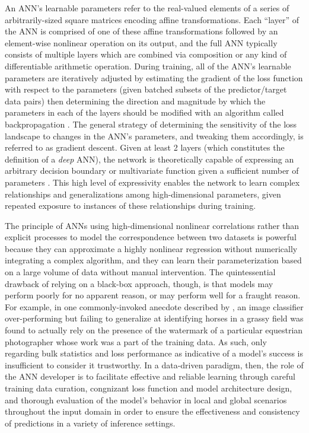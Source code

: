 An ANN's learnable parameters refer to the real-valued elements of a series of arbitrarily-sized square matrices encoding affine transformations. Each ``layer'' of the ANN is comprised of one of these affine transformations followed by an element-wise nonlinear operation on its output, and the full ANN typically consists of multiple layers which are combined via composition or any kind of differentiable arithmetic operation. During training, all of the ANN's learnable parameters are iteratively adjusted by estimating the gradient of the loss function with respect to the parameters (given batched subsets of the predictor/target data pairs) then determining the direction and magnitude by which the parameters in each of the layers should be modified with an algorithm called backpropagation \parencite{rumelhart_learning_1986}. The general strategy of determining the sensitivity of the loss landscape to changes in the ANN's parameters, and tweaking them accordingly, is referred to as gradient descent. Given at least 2 layers (which constitutes the definition of a \textit{deep} ANN), the network is theoretically capable of expressing an arbitrary decision boundary or multivariate function given a sufficient number of parameters \parencite{hornik_multilayer_1989}. This high level of expressivity enables the network to learn complex relationships and generalizations among high-dimensional parameters, given repeated exposure to instances of these relationships during training.

The principle of ANNs using high-dimensional nonlinear correlations rather than explicit processes to model the correspondence between two datasets is powerful because they can approximate a highly nonlinear regression without numerically integrating a complex algorithm, and they can learn their parameterization based on a large volume of data without manual intervention. The quintessential drawback of relying on a black-box approach, though, is that models may perform poorly for no apparent reason, or may perform well for a fraught reason. For example, in one commonly-invoked anecdote described by \parencite{lapuschkin_unmasking_2019}, an image classifier over-performing but failing to generalize at identifying horses in a grassy field was found to actually rely on the presence of the watermark of a particular equestrian photographer whose work was a part of the training data. As such, only regarding bulk statistics and loss performance as indicative of a model's success is insufficient to consider it trustworthy. In a data-driven paradigm, then, the role of the ANN developer is to facilitate effective and reliable learning through careful training data curation, congnizant loss function and model architecture design, and thorough evaluation of the model's behavior in local and global scenarios throughout the input domain in order to ensure the effectiveness and consistency of predictions in a variety of inference settings.

